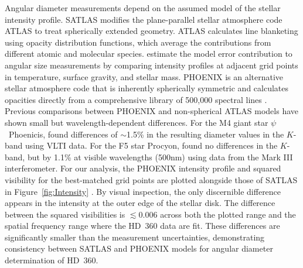 \documentclass[linenumbers,trackchanges]{aastex701}
\begin{document}
Angular diameter measurements depend on the assumed model of the stellar intensity profile. SATLAS modifies the plane-parallel stellar atmosphere code ATLAS to treat spherically extended geometry. ATLAS calculates line blanketing using opacity distribution functions, which average the contributions from different atomic and molecular species. \citet{2018A&A...616A..68G} estimate the model error contribution to angular size measurements by comparing intensity profiles at adjacent grid points in temperature, surface gravity, and stellar mass.
PHOENIX is an alternative stellar atmosphere code that is inherently spherically symmetric and calculates opacities directly from a comprehensive library of 500,000 spectral lines \citep{2013A&A...553A...6H}. Previous comparisons between PHOENIX and non-spherical ATLAS models have shown small but wavelength-dependent differences. For the M4 giant star $\psi$~Phoenicis, \citet{2004A&A...413..711W} found differences of $\sim$1.5\% in the resulting diameter values in the $K$-band using VLTI data. For the F5 star Procyon, \citet{2005ApJ...633..424A} found no differences in the $K$-band, but by 1.1\% at visible wavelengths (500nm) using data from the Mark III interferometer.
For our analysis, the PHOENIX intensity profile and squared visibility for the best-matched grid points are plotted alongside those of SATLAS in Figure~\ref{fig:Intensity} \citep{2023A&A...674A..63C}. By visual inspection, the only discernible difference appears in the intensity at the outer edge of the stellar disk. The difference between the squared visibilities is $\lesssim 0.006$ across both the plotted range and the spatial frequency range where the HD~360 data are fit. These differences are significantly smaller than the measurement uncertainties, demonstrating consistency between SATLAS and PHOENIX models for angular diameter determination of HD~360.


\end{document}
